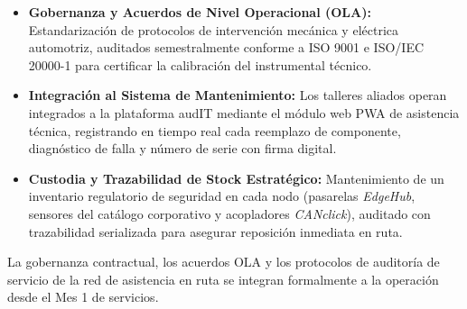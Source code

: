 \begin{itemize}
  \item \textbf{Gobernanza y Acuerdos de Nivel Operacional (OLA):} Estandarización de protocolos de intervención mecánica y eléctrica automotriz, auditados semestralmente conforme a ISO 9001 e ISO/IEC 20000-1 para certificar la calibración del instrumental técnico.
  \item \textbf{Integración al Sistema de Mantenimiento:} Los talleres aliados operan integrados a la plataforma audIT mediante el módulo web PWA de asistencia técnica, registrando en tiempo real cada reemplazo de componente, diagnóstico de falla y número de serie con firma digital.
  \item \textbf{Custodia y Trazabilidad de Stock Estratégico:} Mantenimiento de un inventario regulatorio de seguridad en cada nodo (pasarelas \textit{EdgeHub}, sensores del catálogo corporativo y acopladores \textit{CANclick}), auditado con trazabilidad serializada para asegurar reposición inmediata en ruta.
\end{itemize}

La gobernanza contractual, los acuerdos OLA y los protocolos de auditoría de servicio de la red de asistencia en ruta se integran formalmente a la operación desde el Mes 1 de servicios.

\nocite{cisbenchmarks2024, ley19799, ley21377, ley21663, ley21719, iso9001, iso12207, iso20000_1, iso22301, iso27001, ds43minsal, ds298, codigo_trabajo_25bis, nist_sp800_207, nist_csf2, owasp_asvs4}

